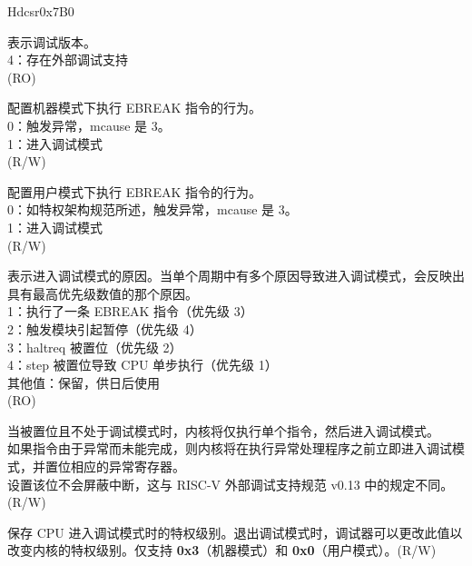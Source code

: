 \begin{register}{H}{dcsr}{0x7B0}\label{regdesc:LPDCSR}
%
%
%
%
%
%
%
%
%
%
\regnewline%
\begin{regdesc}\begin{reglist}
\label{xdebugver}\item [xdebugver] 表示调试版本。\\
4：存在外部调试支持\\
(RO)
\label{ebreakm}\item [ebreakm] 配置机器模式下执行 EBREAK 指令的行为。\\
0：触发异常，mcause 是 3。\\
1：进入调试模式\\
(R/W)
\label{ebreaku}\item [ebreaku] 配置用户模式下执行 EBREAK 指令的行为。\\
0：如特权架构规范所述，触发异常，mcause 是 3。\\
1：进入调试模式\\
(R/W)
\label{cause}\item [cause] 表示进入调试模式的原因。当单个周期中有多个原因导致进入调试模式，会反映出具有最高优先级数值的那个原因。\\
1：执行了一条 EBREAK 指令（优先级 3）\\
2：触发模块引起暂停（优先级 4）\\
3：haltreq 被置位（优先级 2）\\
4：step 被置位导致 CPU 单步执行（优先级 1）\\
其他值：保留，供日后使用\\
(RO)
\label{step}\item [step] 当被置位且不处于调试模式时，内核将仅执行单个指令，然后进入调试模式。\\
如果指令由于异常而未能完成，则内核将在执行异常处理程序之前立即进入调试模式，并置位相应的异常寄存器。\\
设置该位不会屏蔽中断，这与 RISC-V 外部调试支持规范 v0.13 中的规定不同。\\
(R/W)
\label{prv}\item [prv] 保存 CPU 进入调试模式时的特权级别。退出调试模式时，调试器可以更改此值以改变内核的特权级别。仅支持 \textbf{0x3}（机器模式）和 \textbf{0x0}（用户模式）。(R/W)
\end{reglist}\end{regdesc}
\end{register}

